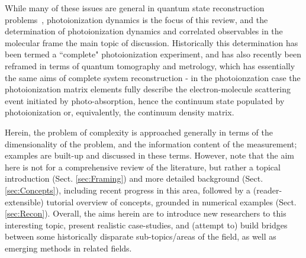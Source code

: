 While many of these issues are general in quantum state reconstruction problems~\cite{Fano1957}, photoionization dynamics is the focus of this review, and the determination of photoionization dynamics and correlated observables in the molecular frame the main topic of discussion. Historically this determination has been termed a ``complete" photoionization experiment, and has also recently been reframed in terms of quantum tomography and metrology, which has essentially the same aims of complete system reconstruction - in the photoionzation case the photoionization matrix elements fully describe the electron-molecule scattering event initiated by photo-absorption, hence the continuum state populated by photoionization or, equivalently, the continuum density matrix.

Herein, the problem of complexity is approached generally in terms of the dimensionality of the problem, and the information content of the measurement; examples are built-up and discussed in these terms. However, note that the aim here is not for a comprehensive review of the literature, but rather a topical introduction (Sect. \ref{sec:Framing}) and more detailed background (Sect. \ref{sec:Concepts}), including recent progress in this area, followed by a (reader-extensible) tutorial overview of concepts, grounded in numerical examples (Sect. \ref{sec:Recon}). Overall, the aims herein are to introduce new researchers to this interesting topic, present realistic case-studies, and (attempt to) build bridges between some historically disparate sub-topics/areas of the field, as well as emerging methods in related fields.


